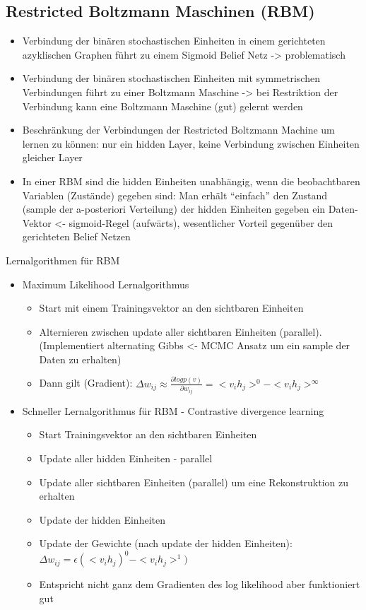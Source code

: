 \documentclass[paper=a4, fontsize=11pt]{scrartcl} %
\numberwithin{equation}{section} %
\numberwithin{figure}{section} %
\numberwithin{table}{section} %
\begin{document}
\subsection{Restricted Boltzmann Maschinen (RBM)}

\begin{itemize}
\item Verbindung der binären stochastischen Einheiten in einem gerichteten azyklischen Graphen führt zu einem Sigmoid Belief Netz -> problematisch
\item Verbindung der binären stochastischen Einheiten mit symmetrischen Verbindungen führt zu einer Boltzmann Maschine -> bei Restriktion der Verbindung kann eine Boltzmann Maschine (gut) gelernt werden
\item Beschränkung der Verbindungen der Restricted Boltzmann Machine  um lernen zu können: nur ein hidden Layer, keine Verbindung zwischen Einheiten gleicher Layer
\item In einer RBM sind die hidden Einheiten unabhängig, wenn die beobachtbaren Variablen (Zustände) gegeben sind: Man erhält ``einfach'' den Zustand (sample der a-posteriori Verteilung) der hidden Einheiten gegeben ein Daten-Vektor <- sigmoid-Regel (aufwärts), wesentlicher Vorteil gegenüber den gerichteten Belief Netzen
\end{itemize}

Lernalgorithmen für RBM
\begin{itemize}
\item Maximum Likelihood Lernalgorithmus
\begin{itemize}
\item Start mit einem Trainingsvektor an den sichtbaren Einheiten
\item Alternieren zwischen update aller sichtbaren Einheiten (parallel). (Implementiert alternating Gibbs <- MCMC Ansatz um ein sample der Daten zu erhalten)
\item Dann gilt (Gradient): $\Delta w_{ij} \approx \frac{\partial log p(v)}{\partial w_{ij}} = <v_i h_j>^0 - <v_i h_j>^\infty$
\end{itemize}
\item Schneller Lernalgorithmus für RBM - Contrastive divergence learning
\begin{itemize}
\item Start Trainingsvektor an den sichtbaren Einheiten
\item Update aller hidden Einheiten - parallel
\item Update aller sichtbaren Einheiten (parallel) um eine Rekonstruktion zu erhalten
\item Update der hidden Einheiten
\item Update der Gewichte (nach update der hidden Einheiten): $\Delta w_{ij} = \epsilon (<v_i h_j)^0 - <v_i h_j>^1)$
\item Entspricht nicht ganz dem Gradienten des log likelihood aber funktioniert gut
\end{itemize}
\end{itemize}
\end{document}
